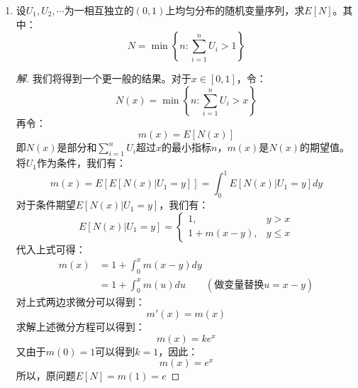 \documentclass[12pt]{article}
\newcommand{\hei}{\CJKfamily{hei}}                          %
\begin{document}
\begin{enumerate}
\item {\hei 设$U_1,U_2,\cdots$为一相互独立的$(0,1)$上均匀分布的随机变量序列，求$E[N]$。其中：
\begin{equation*}
N=\min\left\{n:\sum_{i=1}^nU_i>1\right\}
\end{equation*}}
\begin{proof}[解]
	我们将得到一个更一般的结果。对于$x\in [0,1]$，令：
	\begin{equation}
	N(x)=\min\left\{n:\sum_{i=1}^nU_i>x\right\}
	\end{equation}
	再令：
	\begin{equation}
	m(x)=E[N(x)]
	\end{equation}
	即$N(x)$是部分和$\sum_{i=1}^{n}U_i$超过$x$的最小指标$n$，$m(x)$是$N(x)$的期望值。将$U_1$作为条件，我们有：
	\begin{equation}
	m(x)=E\left[E[N(x)|U_1=y]\right]=\int_{0}^{1}E[N(x)|U_1=y]dy
	\end{equation}
	对于条件期望$E[N(x)|U_1=y]$，我们有：
	\begin{equation}
	E[N(x)|U_1=y]=\left\{
	\begin{array}{cc}
	1, & y>x \\
	1+m(x-y), & y\le x
	\end{array}
	\right.
	\end{equation}
	代入上式可得：
	\begin{equation}
	\begin{aligned}
	m(x)&=1+\int_{0}^xm(x-y)dy \\
	&=1+\int_{0}^xm(u)du\qquad(\mbox{做变量替换}u=x-y)
	\end{aligned}
	\end{equation}
	对上式两边求微分可以得到：
	\begin{equation}
	m'(x)=m(x)
	\end{equation}
	求解上述微分方程可以得到：
	\begin{equation}
	m(x)=ke^x
	\end{equation}
	又由于$m(0)=1$可以得到$k=1$，因此：
	\begin{equation}
	m(x)=e^x
	\end{equation}
	所以，原问题$E[N]=m(1)=e$
\end{proof}


\end{enumerate}
\end{document}
